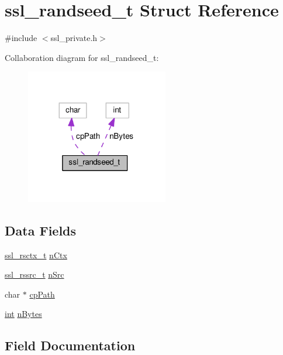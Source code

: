 \hypertarget{structssl__randseed__t}{}\section{ssl\+\_\+randseed\+\_\+t Struct Reference}
\label{structssl__randseed__t}


{\ttfamily \#include $<$ssl\+\_\+private.\+h$>$}



Collaboration diagram for ssl\+\_\+randseed\+\_\+t\+:
\nopagebreak
\begin{figure}[H]
\begin{center}
\leavevmode
\includegraphics[width=176pt]{structssl__randseed__t__coll__graph}
\end{center}
\end{figure}
\subsection*{Data Fields}
\begin{DoxyCompactItemize}
\item 
\hyperlink{group__MOD__SSL__PRIVATE_ga368ff85eb593119b57fd6f64fad13947}{ssl\+\_\+rsctx\+\_\+t} \hyperlink{structssl__randseed__t_afa8456f8bf6cb43388c12ca4e50b8fe4}{n\+Ctx}
\item 
\hyperlink{group__MOD__SSL__PRIVATE_ga950679a8e8bb92658a71bcfdb304390f}{ssl\+\_\+rssrc\+\_\+t} \hyperlink{structssl__randseed__t_af1d3a2bb8da081095e00edb1a2362e75}{n\+Src}
\item 
char $\ast$ \hyperlink{structssl__randseed__t_a609e0b7b2a35df6e73aab906e1ca8b34}{cp\+Path}
\item 
\hyperlink{pcre_8txt_a42dfa4ff673c82d8efe7144098fbc198}{int} \hyperlink{structssl__randseed__t_adf0224c594bfffd1556f8e970d51fbb9}{n\+Bytes}
\end{DoxyCompactItemize}


\subsection{Field Documentation}
